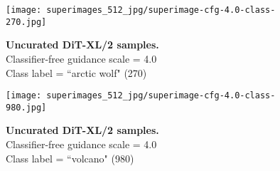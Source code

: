 \documentclass[10pt,twocolumn,letterpaper]{article}
\begin{document}
\begin{table}[t]
    \begin{center}
    \begin{small}
     \end{small}
    \end{center}
    \vspace{-4mm}
    \caption{\textbf{Gflop counts for baseline diffusion models that use U-Net backbones.} Note that we only count Flops for DDPM components.}
    \label{tbl:baseline-flops}
\end{table}

\clearpage
\pagestyle{fancy}
\fancyhead{}

\begin{figure}\centering
\texttt{[image: superimages\_512\_jpg/superimage-cfg-4.0-class-270.jpg]}
\caption{\textbf{Uncurated  DiT-XL/2 samples.} \\Classifier-free guidance scale = 4.0\\Class label = ``arctic wolf" (270)}\vspace{-2mm}
\label{fig:samples512_1}
\end{figure}

\begin{figure}\centering
\texttt{[image: superimages\_512\_jpg/superimage-cfg-4.0-class-980.jpg]}
\caption{\textbf{Uncurated  DiT-XL/2 samples.} \\Classifier-free guidance scale = 4.0\\Class label = ``volcano" (980)}\vspace{-2mm}
\label{fig:samples512_2}
\end{figure}
\end{document}
